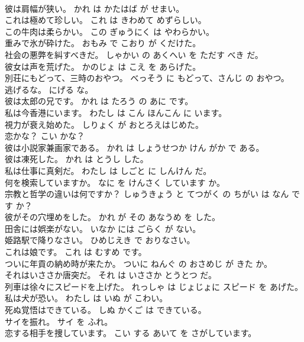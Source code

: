 \documentclass[8pt]{extreport}
\begin{document}
\begin{CJK}{UTF8}{min}
\\	彼は肩幅が狭い。	かれ は かたはば が せまい。	
\\	これは極めて珍しい。	これ は きわめて めずらしい。	
\\	この牛肉は柔らかい。	この ぎゅうにく は やわらかい。	
\\	重みで氷が砕けた。	おもみ で こおり が くだけた。	
\\	社会の悪弊を糾すべきだ。	しゃかい の あくへい を ただす べき だ。	
\\	彼女は声を荒げた。	かのじょ は こえ を あらげた。	
\\	別荘にもどって、三時のおやつ。	べっそう に もどって、さんじ の おやつ。	
\\	逃げるな。	にげる な。	
\\	彼は太郎の兄です。	かれ は たろう の あに です。	
\\	私は今香港にいます。	わたし は こん ほんこん に います。	
\\	視力が衰え始めた。	しりょく が おとろえはじめた。	
\\	恋かな？	こい かな？	
\\	彼は小説家兼画家である。	かれ は しょうせつか けん がか で ある。	
\\	彼は凍死した。	かれ は とうし した。	
\\	私は仕事に真剣だ。	わたし は しごと に しんけん だ。	
\\	何を検索していますか。	なに を けんさく しています か。	
\\	宗教と哲学の違いは何ですか？	しゅうきょう と てつがく の ちがい は なん です か？	
\\	彼がその穴埋めをした。	かれ が その あなうめ を した。	
\\	田舎には娯楽がない。	いなか には ごらく が ない。	
\\	姫路駅で降りなさい。	ひめじえき で おりなさい。	
\\	これは娘です。	これ は むすめ です。	
\\	ついに年貢の納め時が来たか。	ついに ねんぐ の おさめじ が きた か。	
\\	それはいささか唐突だ。	それ は いささか とうとつ だ。	
\\	列車は徐々にスピードを上げた。	れっしゃ は じょじょに スピード を あげた。	
\\	私は犬が恐い。	わたし は いぬ が こわい。	
\\	死ぬ覚悟はできている。	しぬ かくご は できている。	
\\	サイを振れ。	サイ を ふれ。	
\\	恋する相手を捜しています。	こい する あいて を さがしています。	

\end{CJK}
\end{document}
